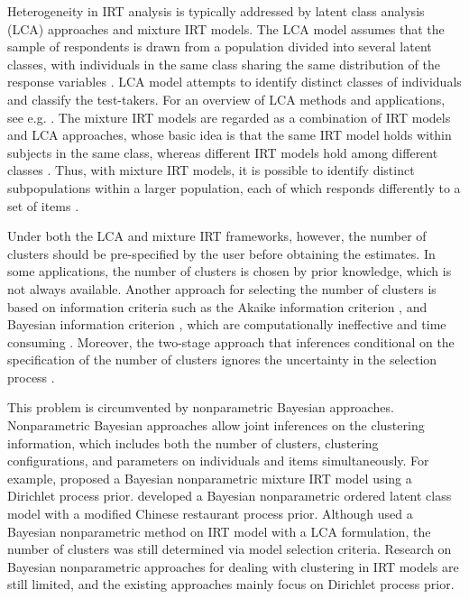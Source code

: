 \documentclass[12pt]{article}
\begin{document}
Heterogeneity in IRT analysis is typically addressed by latent class analysis (LCA) approaches and mixture IRT models. 
The LCA model assumes that the sample of respondents is drawn from a population divided into several latent classes, with individuals in the same class sharing the same distribution of the response variables \citep[][]{lazarsfeld1968latent}. LCA model attempts to identify distinct classes of individuals and classify the test-takers. For an overview of LCA methods and applications, see e.g. \cite{hagenaars2002applied}.
The mixture IRT models are regarded as a combination of IRT models and LCA approaches, whose basic idea is that the same IRT model holds within subjects in the same class, whereas different IRT models hold among different classes \citep[][]{gnaldi2016multilevel}. Thus, with mixture IRT models, it is possible to identify distinct subpopulations within a larger population, each of which responds differently to a set of items \citep[][]{rost1990rasch, rost1997applications}. 



Under both the LCA and mixture IRT frameworks, however, the number of clusters should be pre-specified by the user before obtaining the estimates.
In some applications, the number of clusters is chosen by prior knowledge, which is not always available. Another approach for selecting the number of clusters is based on information criteria such as the
Akaike information criterion \citep[AIC;][]{akaike1998information, bartolucci2007class}, and Bayesian information criterion \citep[BIC;][]{schwarz1978estimating}, which are computationally ineffective and time consuming \citep[][]{pan2014bayesian}. Moreover, the two-stage approach that inferences conditional on the specification of the number of clusters ignores the uncertainty in the selection process \citep[][]{yang2011nonparametric}.

This problem is circumvented by nonparametric Bayesian approaches. Nonparametric Bayesian approaches allow joint inferences on the clustering information, which includes both the number of clusters, clustering configurations, and parameters on individuals and items simultaneously. For example, \citet{miyazaki2009bayesian} proposed a Bayesian nonparametric mixture IRT model using a Dirichlet process prior. \citet{liu2019three} developed a Bayesian nonparametric ordered latent class model with a modified Chinese restaurant process prior. Although \cite{bartolucci2017nonparametric} used a Bayesian nonparametric method on IRT model with a LCA formulation, the number of clusters was still determined via model selection criteria. 
Research on Bayesian nonparametric approaches for dealing with clustering in IRT models are still limited, and the existing approaches mainly focus on Dirichlet process prior. 
\end{document}
